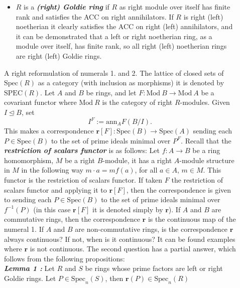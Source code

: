 \documentclass[final]{beamer}
\newlength{\sepwidth}
\newlength{\colwidth}
\newcommand{\ideal}{\trianglelefteq}
\newcommand{\spec}{\mathrm{Spec}}
\newcommand{\SPEC}{\mathrm{SPEC}}
\newcommand{\Mod}[1]{\mathrm{Mod}~#1}
\newcommand{\separatorcolumn}{\begin{column}{\sepwidth}\end{column}}
\newcommand{\defi}[1]{\textbf{\textsl{#1}}}
\newcommand{\ann}{\mathrm{ann}}
\begin{document}
\begin{frame}[t, fragile]
\begin{columns}[t]
\begin{column}{\colwidth}
\end{column}

\separatorcolumn

\begin{column}{\colwidth}
    \begin{itemize}
        \item $R$ is a \defi{(right) Goldie ring} if $R$ as right module over itself has finite rank and satisfies the ACC on right annihilators. If $R$ is right (left) noetherian it clearly satisfies the ACC on right (left) annihilators, and it can be demonstrated that a left or right noetherian ring, as a module over itself, has finite rank, so all right (left) noetherian rings are right (left) Goldie rings.
    \end{itemize}
  \begin{block}{A right reformulation of numerals 1. and 2.}
    The lattice of closed sets of $\spec(R)$ as a category (with inclusion as morphisms) it is denoted by $\SPEC(R)$. Let $A$ and $B$ be rings, and let $F:\Mod{B}\to \Mod{A}$ be a covariant functor where $\Mod{R}$ is the category of right $R$-modules. Given $I\ideal B$, set 
    \begin{equation*}
        I^F:=\ann_A F(B/I).
    \end{equation*}
    This makes a correspondence $\mathbf{r}[F]:\spec(B)\to\spec(A)$ sending each $P\in\spec(B)$ to the set of prime ideals minimal over $P^F$. Recall that the \defi{restriction of scalars functor} is as follows: Let $f:A\to B$ be a ring homomorphism, $M$ be a right $B$-module, it has a right $A$-module structure in $M$ in the following way $m\cdot a = mf(a)$, for all $a\in A$, $m\in M$. This functor is the restriction of scalars functor. If taken $F$ the restriction of scalars functor and applying it to $\mathbf{r}[F]$, then the correspondence is given to sending each $P\in\spec(B)$ to the set of prime ideals minimal over $f^{-1}(P)$ (in this case $\mathbf{r}[F]$ it is denoted simply by $\mathbf{r}$). If $A$ and $B$ are commutative rings, then the correspondence $\mathbf{r}$ is the continuous map of the numeral 1. If $A$ and $B$ are non-commutative rings, is the correspondence $\mathbf{r}$ always continuous? If not, when is it continuous? It can be found examples where $\mathbf{r}$ is not continuous. The second question has a partial answer, which follows from the following propositions:\\
    \vspace{0.5cm}\defi{Lemma 1 \textbf{\cite{Warfield}}:} Let $R$ and $S$ be rings whose prime factors are left or right Goldie rings. Let $P\in\spec_n(S)$, then $\mathbf{r}(P)\in\spec_n(R)$\\

\end{block}
\end{column}
\end{columns}
\end{frame}
\end{document}
